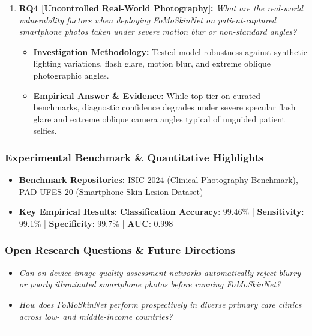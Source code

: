 \begin{enumerate}[label=\textbf{\arabic*.}, leftmargin=*]
\begin{itemize}[leftmargin=1.5em]
    \item \textbf{Empirical Answer \& Evidence:} Established state-of-the-art benchmark accuracy across non-dermoscopic repositories, proving that specialized optical hardware is not strictly necessary for AI-assisted screening.
  \end{itemize}
  \item \textbf{RQ4 [Uncontrolled Real-World Photography]:} \textit{What are the real-world vulnerability factors when deploying FoMoSkinNet on patient-captured smartphone photos taken under severe motion blur or non-standard angles?}
  \begin{itemize}[leftmargin=1.5em]
    \item \textbf{Investigation Methodology:} Tested model robustness against synthetic lighting variations, flash glare, motion blur, and extreme oblique photographic angles.
    \item \textbf{Empirical Answer \& Evidence:} While top-tier on curated benchmarks, diagnostic confidence degrades under severe specular flash glare and extreme oblique camera angles typical of unguided patient selfies.
  \end{itemize}
\end{enumerate}

\subsubsection*{Experimental Benchmark \& Quantitative Highlights}
\begin{itemize}[leftmargin=*]
  \item \textbf{Benchmark Repositories:} ISIC 2024 (Clinical Photography Benchmark), PAD-UFES-20 (Smartphone Skin Lesion Dataset)
  \item \textbf{Key Empirical Results:} \textbf{Classification Accuracy}: 99.46\% \quad | \quad \textbf{Sensitivity}: 99.1\% \quad | \quad \textbf{Specificity}: 99.7\% \quad | \quad \textbf{AUC}: 0.998
\end{itemize}

\subsubsection*{Open Research Questions \& Future Directions}
\begin{itemize}[leftmargin=*]
  \item \textit{Can on-device image quality assessment networks automatically reject blurry or poorly illuminated smartphone photos before running FoMoSkinNet?}
  \item \textit{How does FoMoSkinNet perform prospectively in diverse primary care clinics across low- and middle-income countries?}
\end{itemize}
\vspace{0.8em}\hrule\vspace{1.2em}
